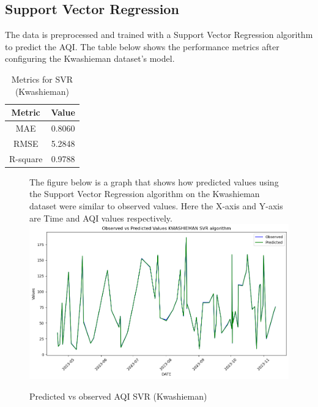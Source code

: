 \documentclass{book}
\numberwithin{equation}{section}
\numberwithin{figure}{section}
\begin{document}
\subsection{Support Vector Regression}
The data is preprocessed and trained with a Support Vector Regression algorithm to predict the AQI. The table below shows the performance metrics after configuring the Kwashieman dataset's model.
\begin{table}[H]
    \centering
    \begin{tabular}{|c|c|}
        \hline
        \textbf{Metric} & \textbf{Value} \\
        \hline
        MAE & 0.8060 \\
        \hline
        RMSE & 5.2848 \\
        \hline
        R-square & 0.9788 \\
        \hline
    \end{tabular}
    \caption{Metrics for SVR (Kwashieman)}
    \label{tab: SVR metrics (Kwashieman)}
\end{table}
\begin{figure}[H]
 \begin{minipage}{\linewidth}
        The figure below is a graph that shows how predicted values using the Support Vector Regression algorithm on the Kwashieman dataset were similar to observed values. Here the X-axis and Y-axis are Time and AQI values respectively.
        \vspace{0.5em} 
        \includegraphics[width=\linewidth]{kwashieman svr.png}
       
        \caption{ Predicted vs observed AQI SVR (Kwashieman)}
        \label{fig: SVR Predicted vs observed AQI (Kwashieman)}
    \end{minipage}
\end{figure}
\end{document}
